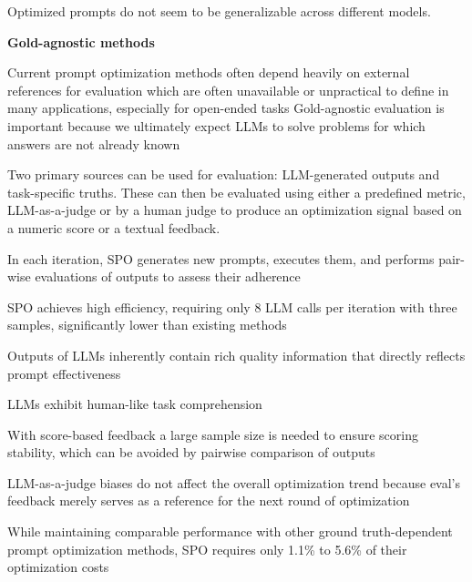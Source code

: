 Optimized prompts do not seem to be generalizable across different models.  \cite{ye2024promptengineeringpromptengineer}


\textbf{Gold-agnostic methods}

Current prompt optimization methods often depend heavily on external references for evaluation which are often unavailable or unpractical to define in many applications, especially for open-ended tasks \cite{xiang2025selfsupervisedpromptoptimization}
Gold-agnostic evaluation is important because we ultimately expect LLMs to solve problems for which answers are not already known \cite{zhang2024glapegoldlabelagnosticprompt}

Two primary sources can be used for evaluation: LLM-generated outputs and task-specific truths. These can then be evaluated using either a predefined metric, LLM-as-a-judge or by a human judge to produce an optimization signal based on a numeric score or a textual feedback.  \cite{xiang2025selfsupervisedpromptoptimization}

In each iteration, SPO generates new prompts, executes them, and performs pair-wise evaluations of outputs to assess their adherence \cite{xiang2025selfsupervisedpromptoptimization}

SPO achieves high efficiency, requiring only 8 LLM calls per iteration with three samples, significantly lower than existing methods \cite{xiang2025selfsupervisedpromptoptimization}

Outputs of LLMs inherently contain rich quality information that directly reflects prompt effectiveness \cite{xiang2025selfsupervisedpromptoptimization}

LLMs exhibit human-like task comprehension \cite{xiang2025selfsupervisedpromptoptimization}

With score-based feedback a large sample size is needed to ensure scoring stability, which can be avoided by pairwise comparison of outputs \cite{xiang2025selfsupervisedpromptoptimization}

LLM-as-a-judge biases do not affect the overall optimization trend because eval’s feedback merely serves as a reference for the next round of optimization \cite{xiang2025selfsupervisedpromptoptimization}

While maintaining comparable performance with other ground truth-dependent prompt optimization methods, SPO requires only 1.1\% to 5.6\% of their optimization costs \cite{xiang2025selfsupervisedpromptoptimization}



